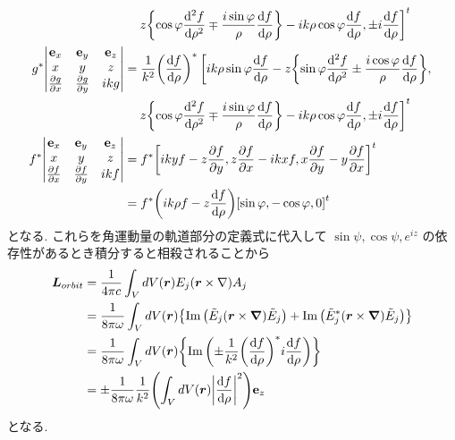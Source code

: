 \documentclass[uplatex,dvipdfmx,a4paper,11pt]{jlreq}
\newcommand{\rr}{\bm{r}}
\theoremstyle{definition}
\begin{document}
\begin{align}
                    & \quad \left. z\qty{\cos\varphi\dv[2]{f}{\rho} \mp \frac{i\sin\varphi}{\rho} \dv{f}{\rho}} - i k\rho\cos\varphi\dv{f}{\rho}, \pm i\dv{f}{\rho}\right]^t                                                                                                                                \\
  g^*\mqty|\vb{e}_x & \vb{e}_y                                                                                                                                                                                                                                                        & \vb{e}_z            \\ x & y & z \\ \pdv{g}{x} & \pdv{g}{y} & i kg |
                    & = \frac{1}{k^2}\qty(\dv{f}{\rho})^*\left[i k\rho\sin\varphi\dv{f}{\rho} - z\qty{\sin\varphi\dv[2]{f}{\rho} \pm \frac{i\cos\varphi}{\rho}\dv{f}{\rho}},\right.                                                                                                                         \\
                    & \quad \left. z\qty{\cos\varphi\dv[2]{f}{\rho} \mp \frac{i\sin\varphi}{\rho} \dv{f}{\rho}} - i k\rho\cos\varphi\dv{f}{\rho}, \pm i\dv{f}{\rho}\right]^t                                                                                                                                \\
  f^*\mqty|\vb{e}_x & \vb{e}_y                                                                                                                                                                                                                                                        & \vb{e}_z            \\ x & y & z \\ \pdv{f}{x} & \pdv{f}{y} & i kf |
                    & = f^* \qty[i kyf - z\pdv{f}{y}, z\pdv{f}{x} - i kxf, x\pdv{f}{y} - y\pdv{f}{x}]^t                                                                                                                                                                                                     \\
                    & = f^* \qty(i k\rho f - z\dv{f}{\rho})\qty[\sin\varphi, -\cos\varphi, 0]^t
\end{align}
となる. これらを角運動量の軌道部分の定義式に代入して $\sin\psi, \cos\psi, e^{i z}$ の依存性があるとき積分すると相殺されることから
\begin{align}
  \LL_{orbit} & = \frac{1}{4\pi c}\int_VdV(\rr)E_j(\rr\times\nabla)A_j                                                                   \\
              & = \frac{1}{8\pi\omega}\int_VdV(\rr)\qty{\Im\qty(\Et_j(\rr\times\vnabla)\Et_j) + \Im\qty(\Et_j^*(\rr\times\vnabla)\Et_j)} \\
              & = \frac{1}{8\pi\omega}\int_VdV(\rr)\qty{\Im\qty(\pm\frac{1}{k^2}\qty(\dv{f}{\rho})^*i\dv{f}{\rho})}                      \\
              & = \pm\frac{1}{8\pi\omega}\frac{1}{k^2}\qty(\int_VdV(\rr)\qty|\dv{f}{\rho}|^2)\vb{e}_z
\end{align}
となる. \\
\end{document}
